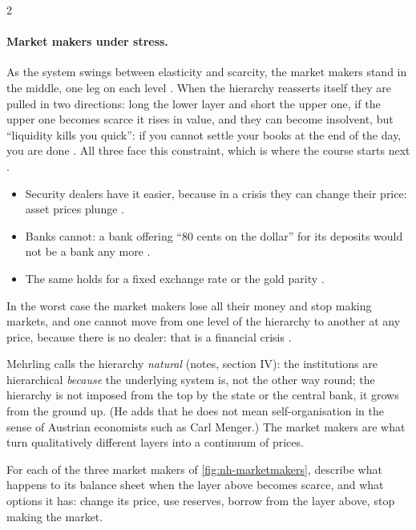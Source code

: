 \begin{paracol}{2}
\paragraph{Market makers under stress.} As the system swings between elasticity and scarcity, the market makers stand
in the middle, one leg on each level . When the hierarchy reasserts itself they are pulled
in two directions: long the lower layer and short the upper one, if the upper one becomes scarce it rises in value, and
they can become insolvent, but ``liquidity kills you quick'': if you cannot settle your books at the end of the day, you
are done . All three face this constraint, which is where the course starts next
.
\begin{itemize}
  \item Security dealers have it easier, because in a crisis they can change their price: asset prices plunge
        .
  \item Banks cannot: a bank offering ``80 cents on the dollar'' for its deposits would not be a bank any more
        .
  \item The same holds for a fixed exchange rate or the gold parity .
\end{itemize}
In the worst case the market makers lose all their money and stop making markets, and one cannot move from one level
of the hierarchy to another at any price, because there is no dealer: that is a financial crisis .

\begin{intuition}
Mehrling calls the hierarchy \emph{natural} (notes, section IV): the institutions are hierarchical \emph{because} the
underlying system is, not the other way round; the hierarchy is not imposed from the top by the state or the central
bank, it grows from the ground up. (He adds that he does not mean self-organisation in the sense of Austrian economists
such as Carl Menger.) The market makers are what turn qualitatively different layers into a continuum of prices.
\end{intuition}

\begin{exercise}
For each of the three market makers of \cref{fig:nh-marketmakers}, describe what happens to its balance sheet when the
layer above becomes scarce, and what options it has: change its price, use reserves, borrow from the layer above, stop
making the market.
\end{exercise}


\end{paracol}
